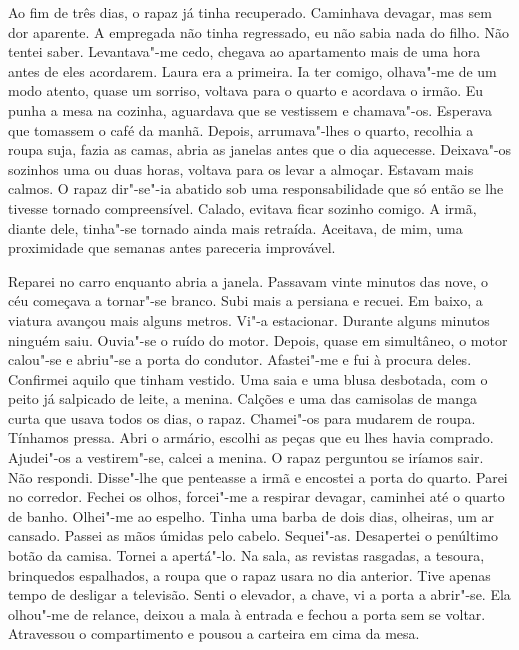 Ao fim de três dias, o rapaz já tinha recuperado. Caminhava devagar, mas
sem dor aparente. A empregada não tinha regressado, eu não sabia nada do
filho. Não tentei saber. Levantava"-me cedo, chegava ao apartamento mais
de uma hora antes de eles acordarem. Laura era a primeira. Ia ter
comigo, olhava"-me de um modo atento, quase um sorriso, voltava para o
quarto e acordava o irmão. Eu punha a mesa na cozinha, aguardava que se
vestissem e chamava"-os. Esperava que tomassem o café da manhã.
Depois, arrumava"-lhes o quarto, recolhia a roupa suja, fazia as camas,
abria as janelas antes que o dia aquecesse. Deixava"-os sozinhos uma ou
duas horas, voltava para os levar a almoçar. Estavam mais calmos. O
rapaz dir"-se"-ia abatido sob uma responsabilidade que só então se lhe
tivesse tornado compreensível. Calado, evitava ficar sozinho comigo. A
irmã, diante dele, tinha"-se tornado ainda mais retraída. Aceitava, de
mim, uma proximidade que semanas antes pareceria improvável.

Reparei no carro enquanto abria a janela. Passavam vinte minutos das
nove, o céu começava a tornar"-se branco. Subi mais a persiana e recuei.
Em baixo, a viatura avançou mais alguns metros. Vi"-a estacionar.
Durante alguns minutos ninguém saiu. Ouvia"-se o ruído do motor. Depois,
quase em simultâneo, o motor calou"-se e abriu"-se a porta do condutor.
Afastei"-me e fui à procura deles. Confirmei aquilo que tinham vestido.
Uma saia e uma blusa desbotada, com o peito já salpicado de leite, a
menina. Calções e uma das camisolas de manga curta que usava todos os
dias, o rapaz. Chamei"-os para mudarem de roupa. Tínhamos pressa. Abri o
armário, escolhi as peças que eu lhes havia comprado. Ajudei"-os a
vestirem"-se, calcei a menina. O rapaz perguntou se iríamos sair. Não
respondi. Disse"-lhe que penteasse a irmã e encostei a porta do quarto.
Parei no corredor. Fechei os olhos, forcei"-me a respirar devagar,
caminhei até o quarto de banho. Olhei"-me ao espelho. Tinha uma barba
de dois dias, olheiras, um ar cansado. Passei as mãos úmidas pelo
cabelo. Sequei"-as. Desapertei o penúltimo botão da camisa. Tornei a
apertá"-lo. Na sala, as revistas rasgadas, a tesoura, brinquedos
espalhados, a roupa que o rapaz usara no dia anterior. Tive apenas tempo
de desligar a televisão. Senti o elevador, a chave, vi a porta a
abrir"-se. Ela olhou"-me de relance, deixou a mala à entrada e fechou a
porta sem se voltar. Atravessou o compartimento e pousou a carteira em
cima da mesa.

